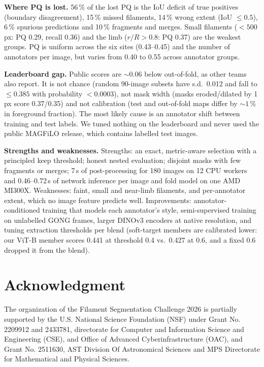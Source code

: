 \documentclass[sigconf]{acmart}
\begin{document}
\textbf{Where PQ is lost.} 56\,\% of the lost PQ is the IoU deficit of true positives (boundary disagreement), 15\,\% missed filaments, 14\,\% wrong extent (IoU $\le0.5$), 6\,\% spurious predictions and 10\,\% fragments and merges. Small filaments ($<500$\,px: PQ 0.29, recall 0.36) and the limb ($r/R>0.8$: PQ 0.37) are the weakest groups. PQ is uniform across the six sites (0.43--0.45) and the number of annotators per image, but varies from 0.40 to 0.55 across annotator groups.

\textbf{Leaderboard gap.} Public scores are ${\sim}0.06$ below out-of-fold, as other teams also report. It is not chance (random 90-image subsets have s.d.\ 0.012 and fall to $\le0.385$ with probability $<0.0003$), not mask width (masks eroded/dilated by 1\,px score 0.37/0.35) and not calibration (test and out-of-fold maps differ by ${\sim}1$\,\% in foreground fraction). The most likely cause is an annotator shift between training and test labels. We tuned nothing on the leaderboard and never used the public MAGFiLO release, which contains labelled test images.

\textbf{Strengths and weaknesses.} Strengths: an exact, metric-aware selection with a principled keep threshold; honest nested evaluation; disjoint masks with few fragments or merges; 7\,s of post-processing for 180 images on 12 CPU workers and 0.46--0.72\,s of network inference per image and fold model on one AMD MI300X. Weaknesses: faint, small and near-limb filaments, and per-annotator extent, which no image feature predicts well. Improvements: annotator-conditioned training that models each annotator's style, semi-supervised training on unlabelled GONG frames, larger DINOv3 encoders at native resolution, and tuning extraction thresholds per blend (soft-target members are calibrated lower: our ViT-B member scores 0.441 at threshold 0.4 vs.\ 0.427 at 0.6, and a fixed 0.6 dropped it from the blend).

\section{Acknowledgment}\label{sec:acknowledgment}
    The organization of the Filament Segmentation Challenge 2026 is partially supported by the U.S. National Science Foundation (NSF) under Grant No. 2209912 and 2433781, directorate for Computer and Information Science and Engineering (CSE), and Office of Advanced Cyberinfrastructure (OAC), and Grant No. 2511630, AST Division Of Astronomical Sciences and MPS Directorate for Mathematical and Physical Sciences.
\end{document}
